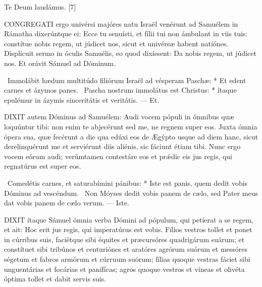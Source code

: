 Te Deum laudámus. [7]








\lettrine[lines=2]{C}{ONGREGATI} ergo univérsi majóres natu Israël venérunt ad Samuélem in Rámatha dixerúntque ei: Ecce tu senuísti, et fílii tui non ámbulant in viis tuis: constítue nobis regem, ut júdicet nos, sicut et univérsæ habent natiónes. Displícuit sermo in óculis Samuélis, eo quod dixíssent: Da nobis regem, ut júdicet nos. Et orávit Sámuel ad Dóminum.

\R\ Immolábit hædum multitúdo filiórum Israël ad vésperam Paschæ: * Et edent carnes et ázymos panes. \V\ Pascha nostrum immolátus est Christus: * ítaque epulémur in ázymis sinceritátis et veritátis. --- Et.


\lettrine[lines=2]{D}{IXIT} autem Dóminus ad Samuélem: Audi vocem pópuli in ómnibus quæ loquúntur tibi: non enim te abjecérunt sed me, ne regnem super eos. Juxta ómnia ópera sua, quæ fecérunt a die qua edúxi eos de Ægýpto usque ad diem hanc, sicut derelinquérunt me et serviérunt diis aliénis, sic fáciunt étiam tibi. Nunc ergo vocem eórum audi; verúmtamen contestáre eos et prǽdic eis jus regis, qui regnatúrus est super eos.

\R\ Comedétis carnes, et saturabímini pánibus: * Iste est panis, quem dedit vobis Dóminus ad vescéndum. \V\ Non Móyses dedit vobis panem de cælo, sed Pater meus dat vobis panem de cælo verum. --- Iste.


\lettrine[lines=2]{D}{IXIT} ítaque Sámuel ómnia verba Dómini ad pópulum, qui petíerat a se regem, et ait: Hoc erit jus regis, qui imperatúrus est vobis. Fílios vestros tollet et ponet in cúrribus suis, faciétque sibi équites et præcursóres quadrigárum suárum; et constítuet sibi tribúnos et centuriónes et aratóres agrórum suórum et messóres ségetum et fabros armórum et cúrruum suórum; fílias quoque vestras fáciet sibi unguentárias et focárias et panífícas; agros quoque vestros et víneas et olivéta óptima tollet et dabit servis suis.

